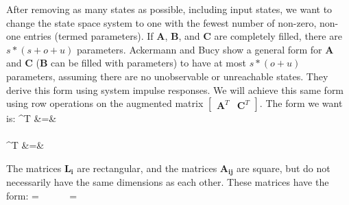After removing as many states as possible, including input states, we
want to change the state space system to one with the fewest number of
non-zero, non-one entries (termed parameters). If $\mathbf{A}$,
$\mathbf{B}$, and $\mathbf{C}$ are completely filled, there are
$s*(s+o+u)$ parameters. Ackermann and Bucy
\cite{Ackermann/Bucy} show a general form for $\mathbf{A}$ and
$\mathbf{C}$ ($\mathbf{B}$ can be filled with parameters) to have
at most $s*(o+u)$ parameters, assuming there are no unobservable
or unreachable states. They derive this form using system impulse
responses. We will achieve this same form using row operations on
the augmented matrix $\left [
\begin{array} {cc} \mathbf{A}^T & \mathbf{C}^T \end{array} \right
]$. The form we want is:
\starteqnstar
{}^T &=&  \\ ~ \\
^T &=& 
\doneeqnstar

The matrices $\mathbf{L_i}$ are rectangular, and the matrices
$\mathbf{A_{ij}}$ are square, but do not necessarily have the same
dimensions as each other. These matrices have the form:
\starteqnstar
{} =  ~~~~~
 = 
\doneeqnstar


